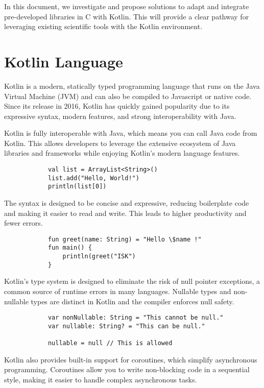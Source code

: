 \documentclass[10pt,twocolumn, a4paper]{article}
\begin{document}
		In this document, we investigate and propose solutions to adapt and integrate pre-developed libraries in C with Kotlin. This will provide a clear pathway for leveraging existing scientific tools with the Kotlin environment.
	\section{Kotlin Language}
		Kotlin is a modern, statically typed programming language that runs on the Java Virtual Machine (JVM) and can also be compiled to Javascript or native code. Since its release in 2016, Kotlin has quickly gained popularity due to its expressive syntax, modern features, and strong interoperability with Java.

		Kotlin is fully interoperable with Java, which means you can call Java code from Kotlin. This allows developers to leverage the extensive ecosystem of Java libraries and frameworks while enjoying Kotlin's modern language features.
		
		\begin{lstlisting}
			val list = ArrayList<String>()
			list.add("Hello, World!")
			println(list[0])
		\end{lstlisting}

		The syntax is designed to be concise and expressive, reducing boilerplate code and making it easier to read and write. This leads to higher productivity and fewer errors.

		\begin{lstlisting}
			fun greet(name: String) = "Hello \$name !"
			fun main() {
				println(greet("ISK")
			}
		\end{lstlisting}

		Kotlin's type system is designed to eliminate the risk of null pointer exceptions, a common source of runtime errors in many languages. Nullable types and non-nullable types are distinct in Kotlin and the compiler enforces null safety.

		\begin{lstlisting}
			var nonNullable: String = "This cannot be null."
			var nullable: String? = "This can be null."

			nullable = null // This is allowed
		\end{lstlisting}

		Kotlin also provides built-in support for coroutines, which simplify asynchronous programming. Coroutines allow you to write non-blocking code in a sequential style, making it easier to handle complex asynchronous tasks.
		
\end{document}
